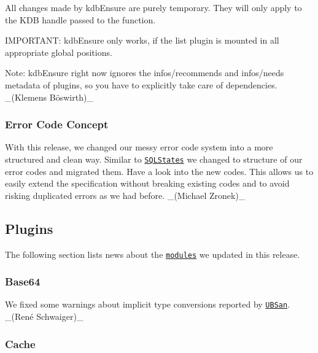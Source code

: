 All changes made by {\ttfamily kdb\+Ensure} are purely temporary. They will only apply to the K\+DB handle passed to the function.

I\+M\+P\+O\+R\+T\+A\+NT\+: {\ttfamily kdb\+Ensure} only works, if the {\ttfamily list} plugin is mounted in all appropriate global positions.

Note\+: {\ttfamily kdb\+Ensure} right now ignores the {\ttfamily infos/recommends} and {\ttfamily infos/needs} metadata of plugins, so you have to explicitly take care of dependencies. \+\_\+(Klemens Böswirth)\+\_\+

\subsubsection*{Error Code Concept}

With this release, we changed our messy error code system into a more structured and clean way. Similar to \href{https://www.ibm.com/support/knowledgecenter/en/SSGU8G_12.1.0/com.ibm.sqls.doc/ids_sqs_0809.htm}{\tt S\+Q\+L\+States} we changed to structure of our error codes and migrated them. Have a look into the new codes. This allows us to easily extend the specification without breaking existing codes and to avoid risking duplicated errors as we had before. \+\_\+(\+Michael Zronek)\+\_\+

\subsection*{Plugins}

The following section lists news about the \href{https://www.libelektra.org/plugins/readme}{\tt modules} we updated in this release.

\subsubsection*{Base64}


\begin{DoxyItemize}
\item We fixed some warnings about implicit type conversions reported by \href{https://clang.llvm.org/docs/UndefinedBehaviorSanitizer.html}{\tt U\+B\+San}. \+\_\+(René Schwaiger)\+\_\+
\end{DoxyItemize}

\subsubsection*{Cache}


